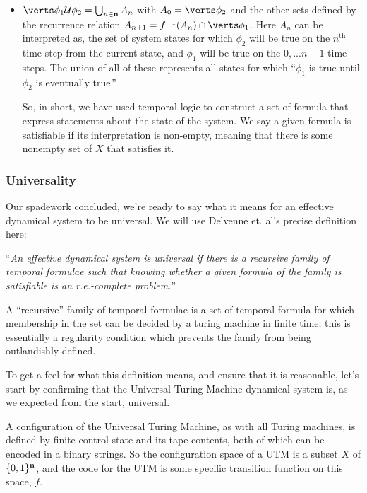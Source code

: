 \documentclass{fkpaper}
\newcommand{\ltil}{\mathcal{U}}
\begin{document}
\begin{multicols}{2}
\begin{itemize}
  \item $\abs{\phi_1 \ltil \phi_2} = \bigcup_{n \in \Nn} A_n$ with $A_0 = \abs{\phi_2}$ and the other sets defined by the recurrence relation $A_{n+1} = f^{-1}(A_n)\cap\abs{\phi_1}$. Here $A_n$ can be interpreted as, the set of system states for which $\phi_2$ will be true on the $n^{\text{th}}$ time step from the current state, and $\phi_1$ will be true on the $0,...n-1$ time steps. The union of all of these represents all states for which ``$\phi_1$ is true until $\phi_2$ is eventually true.''

    So, in short, we have used temporal logic to construct a set of formula that express statements about the state of the system. We say a given formula is satisfiable if its interpretation is non-empty, meaning that there is some nonempty set of $X$ that satisfies it.

\end{itemize}


\subsubsection*{Universality}

Our spadework concluded, we're ready to say what it means for an effective dynamical system to be universal. We will use Delvenne et. al's precise definition here:

``{\it An effective dynamical system is \emph{universal} if there is a recursive family of temporal formulae such that knowing whether a given formula of the family is satisfiable is an r.e.-complete problem.}''

A ``recursive'' family of temporal formulae is a set of temporal formula for which membership in the set can be decided by a turing machine in finite time; this is essentially a regularity condition which prevents the family from being outlandishly defined.

To get a feel for what this definition means, and ensure that it is reasonable, let's start by confirming that the Universal Turing Machine dynamical system  is, as we expected from the start, universal.

A configuration of the Universal Turing Machine, as with all Turing machines, is defined by finite control state and its tape contents, both of which can be encoded in a binary strings. So the configuration space of a UTM is a subset $X$ of $\{0,1\}^{\mathbf{n}}$, and the code for the UTM is some specific transition function on this space, $f$.
\end{multicols}
\end{document}
